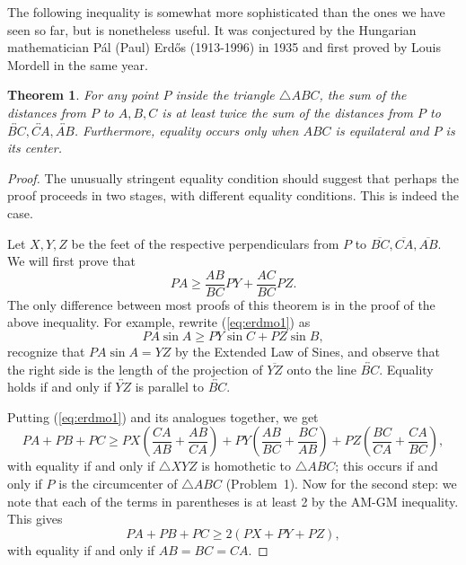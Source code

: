 \documentclass[12pt]{book}
\numberwithin{exc}{section}
\numberwithin{figure}{section}
\newtheorem{theorem}{Theorem}[section]
\numberwithin{equation}{theorem}
\def\line#1{\overleftrightarrow{#1}}
\def\seg#1{\overline{#1}}
\begin{document}
The following inequality is somewhat more sophisticated than the ones 
we have seen so far, but is nonetheless useful. It was conjectured by 
the Hungarian mathematician  P\'al (Paul) 
Erd\H{o}s (1913-1996) 
in 1935 and first proved by
Louis Mordell  in the same year.
\begin{theorem}
For any point $P$ inside the triangle $\triangle ABC$, the sum of the 
distances from $P$ to $A,B,C$ is at least twice the sum of the 
distances from $P$ to $\line{BC},\line{CA},\line{AB}$. Furthermore, 
equality occurs only when $ABC$ is 
equilateral and $P$ is its center.
\end{theorem}
\begin{proof}
The unusually stringent equality condition should suggest that perhaps 
the proof proceeds in two stages, with different equality conditions. 
This is indeed the case.

Let $X,Y,Z$ be the feet of the respective
perpendiculars from $P$ to $\seg{BC},\seg{CA},\seg{AB}$. 
We will first prove that
\begin{equation} \label{eq:erdmo1}
PA \geq  \frac{AB}{BC} PY + \frac{AC}{BC} PZ.
\end{equation}
The only difference between most proofs of this theorem is 
in the proof of the above inequality. For example, rewrite 
(\ref{eq:erdmo1}) as
\[
PA \sin A \geq PY \sin C + PZ \sin B,
\]
recognize that $PA \sin A = YZ$ by the Extended Law of Sines, and 
observe that the right side is the length of the projection of $\seg{YZ}$ 
onto the line $\line{BC}$. Equality holds if and only if $\line{YZ}$ 
is parallel to 
$\line{BC}$.

Putting (\ref{eq:erdmo1}) and its analogues together, we get
\[
PA + PB + PC \geq PX \left( \frac{CA}{AB} + \frac{AB}{CA} \right)
+ PY \left( \frac{AB}{BC} + \frac{BC}{AB} \right)
+ PZ \left( \frac{BC}{CA} + \frac{CA}{BC} \right),
\]
with equality if and only if $\triangle 
XYZ$ is homothetic to $\triangle ABC$; this occurs 
if and only if $P$ is the circumcenter of $\triangle ABC$ (Problem~1).
Now for the second step: we note that each of the 
terms in parentheses is at least 2 by the AM-GM inequality. This gives
\[
PA + PB + PC \geq 2 (PX + PY + PZ),
\]
with equality if and only if $AB = BC = CA$.
\end{proof}
\end{document}
